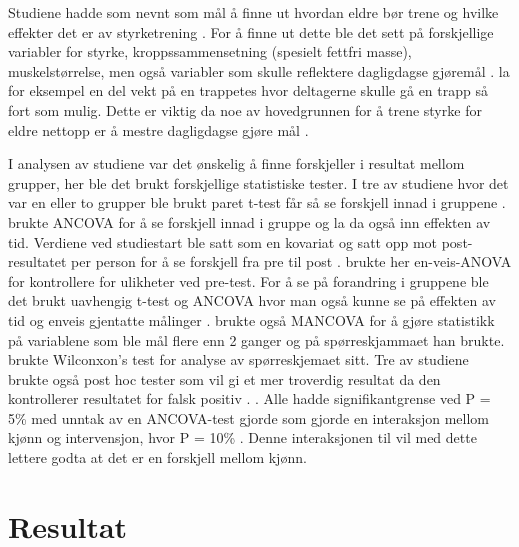 \documentclass[
]{book}
\begin{document}
Studiene hadde som nevnt som mål å finne ut hvordan eldre bør trene og hvilke effekter det er av styrketrening \citep{geirsdottir2012, schott2019, turpela2017, vikberg2019, vincent2002}. For å finne ut dette ble det sett på forskjellige variabler for styrke, kroppssammensetning (spesielt fettfri masse), muskelstørrelse, men også variabler som skulle reflektere dagligdagse gjøremål \citep{geirsdottir2012, schott2019, turpela2017, vikberg2019, vincent2002}. \citet{vincent2002} la for eksempel en del vekt på en trappetes hvor deltagerne skulle gå en trapp så fort som mulig. Dette er viktig da noe av hovedgrunnen for å trene styrke for eldre nettopp er å mestre dagligdagse gjøre mål \citep{vincent2002}.

I analysen av studiene var det ønskelig å finne forskjeller i resultat mellom grupper, her ble det brukt forskjellige statistiske tester. I tre av studiene hvor det var en eller to grupper ble brukt paret t-test får så se forskjell innad i gruppene \citep{geirsdottir2012, vikberg2019, vincent2002}. \citet{vincent2002} brukte ANCOVA for å se forskjell innad i gruppe og la da også inn effekten av tid. Verdiene ved studiestart ble satt som en kovariat og satt opp mot post-resultatet per person for å se forskjell fra pre til post \citep{vincent2002}. \citet{turpela2017} brukte her en-veis-ANOVA for kontrollere for ulikheter ved pre-test. For å se på forandring i gruppene ble det brukt uavhengig t-test og ANCOVA hvor man også kunne se på effekten av tid og enveis gjentatte målinger \citep{schott2019, turpela2017, vikberg2019, vincent2002}. \citet{schott2019} brukte også MANCOVA for å gjøre statistikk på variablene som ble mål flere enn 2 ganger og på spørreskjammaet han brukte. \citet{geirsdottir2012} brukte Wilconxon's test for analyse av spørreskjemaet sitt. Tre av studiene brukte også post hoc tester som vil gi et mer troverdig resultat da den kontrollerer resultatet for falsk positiv \citep[s. 50-52]{hulley2013}. \citep{schott2019, turpela2017, vincent2002}. Alle hadde signifikantgrense ved P = 5\% med unntak av en ANCOVA-test \citet{vikberg2019} gjorde som gjorde en interaksjon mellom kjønn og intervensjon, hvor P = 10\% \citep{geirsdottir2012, schott2019, turpela2017, vincent2002}. Denne interaksjonen til \citet{vikberg2019} vil med dette lettere godta at det er en forskjell mellom kjønn.

\hypertarget{resultat}{%
\section{Resultat}\label{resultat}}
\end{document}
